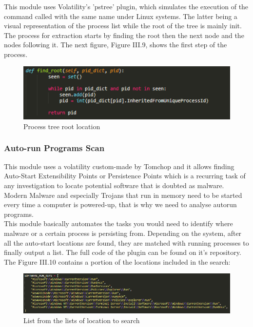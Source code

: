 \begin{enumerate}[label=(\alph*)]
    This module uses Volatility's 'pstree' plugin, which simulates the execution of the command called with the same name under Linux systems. The latter being a visual representation of the process list while the root of the tree is mainly init. The process for extraction starts by finding the root then the next node and the nodes following it. The next figure, Figure III.9, shows the first step of the process.
    \begin{figure}[H]
    \centering
    \includegraphics[width=0.8\columnwidth]{Figures/pstree.png}
    \caption{Process tree root location}
    \end{figure}
\end{enumerate}

\subsubsection{Auto-run Programs Scan}
This module uses a volatility custom-made by Tomchop\cite{tomchop} and it allows finding Auto-Start Extensibility Points or Persistence Points which is a recurring task of any investigation to locate potential software that is doubted as malware.\\
Modern Malware and especially Trojans that run in memory need to be started every time a computer is powered-up, that is why we need to analyse autorun programs.\\
This module basically automates the tasks you would need to identify where malware or a certain process is persisting from. Depending on the system, after all the auto-start locations are found, they are matched with running processes to finally output a list. The full code of the plugin can be found on it's repository\cite{autorun_repo}. The Figure III.10 contains a portion of the locations included in the search:
\begin{figure}[H]
\centering
\includegraphics[width=0.8\columnwidth]{Figures/autoruns.png}
\caption{List from the lists of location to search}
\end{figure}

